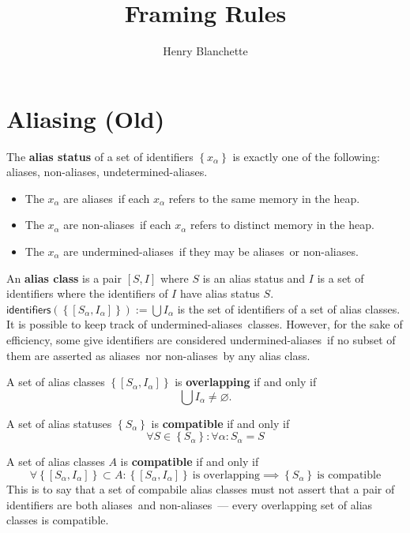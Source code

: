\documentclass{article}
\title{Framing Rules}
\author{Henry Blanchette}
\date{}
\newcommand{\tsf}{\textsf}
\newcommand{\tbf}{\textbf}
\newcommand{\set}[1]{\left\{ #1 \right\}}
\renewcommand{\empty}{\varnothing}
\newcommand{\aliases}{\tsf{aliases}}
\newcommand{\nonaliases}{\tsf{non-aliases}}
\newcommand{\unaliases}{\tsf{undermined-aliases}}
\begin{document}
\newpage
\section{Aliasing (Old)}

The \tbf{alias status} of a set of identifiers $\set{ x_\alpha }$ is exactly one of the following: \aliases, \nonaliases, \tsf{undetermined-aliases}.
\begin{itemize}
\item The $x_\alpha$ are \aliases\ if each $x_\alpha$ refers to the same memory in the heap.
\item The $x_\alpha$ are \nonaliases\ if each $x_\alpha$ refers to distinct memory in the heap.
\item The $x_\alpha$ are \unaliases\ if they may be \aliases\ or \nonaliases.
\end{itemize}

\noindent
An \tbf{alias class} is a pair $[S,I]$ where $S$ is an alias status and $I$ is a set of identifiers where the identifiers of $I$ have alias status $S$.
$\tsf{identifiers}(\set{[S_\alpha, I_\alpha]}) := \bigcup I_\alpha$ is the set of identifiers of a set of alias classes.
It is possible to keep track of \unaliases\ classes. However, for the sake of efficiency, some give identifiers are considered \unaliases\ if no subset of them are asserted as \aliases\ nor \nonaliases\ by any alias class.

\noindent
A set of alias classes $\set{ [S_\alpha, I_\alpha] }$ is \tbf{overlapping} if and only if
$$ \bigcup I_\alpha \neq \empty. $$

\noindent
A set of alias statuses $\set{ S_\alpha }$ is \tbf{compatible} if and only if
$$ \forall S \in \set{S_\alpha} : \forall \alpha : S_\alpha = S $$

\noindent
A set of alias classes $A$ is \tbf{compatible} if and only if
$$
\forall \set{ [S_\alpha, I_\alpha] } \subset A :
\set{ [S_\alpha, I_\alpha] } \ \text{is overlapping}
\implies
\set{ S_\alpha } \ \text{is compatible}
$$
This is to say that a set of compabile alias classes must not assert that a pair of identifiers are both \aliases\ and \nonaliases\ --- every overlapping set of alias classes is compatible.
\end{document}
